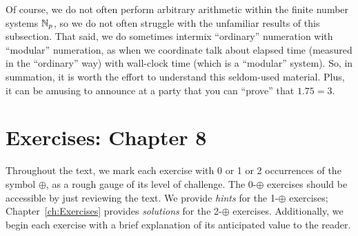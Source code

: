 \medskip

Of course, we do not often perform arbitrary arithmetic within the finite number systems $\mathbb{N}_p$, so we do not often struggle with the unfamiliar results of this subsection.  That said, we do sometimes intermix ``ordinary'' numeration with ``modular'' numeration, as when we coordinate talk about elapsed time (measured in the ``ordinary'' way) with wall-clock time (which is a ``modular'' system).  So, in summation, it is worth the effort to understand this seldom-used material.  Plus, it can be amusing to announce at a party that you can ``prove'' that $1.75 = 3$.




\section{Exercises: Chapter 8}
\label{sec:EX-NUM2}

Throughout the text, we mark each exercise with 0 or 1 or 2 occurrences of the symbol $\oplus$, as a rough gauge of its level of challenge.  The 0-$\oplus$ exercises should be accessible by just reviewing the text.  We provide {\em hints} for the 1-$\oplus$ exercises; Chapter~\ref{ch:Exercises} provides {\em solutions} for the 2-$\oplus$ exercises.  Additionally, we begin each exercise with a brief explanation of its anticipated value to the reader.
 

